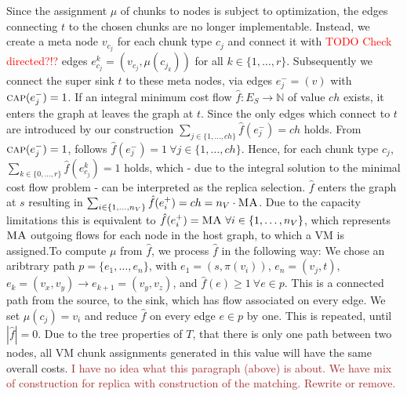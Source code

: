 \documentclass[9pt,twocolumn]{scrartcl}
\newcommand{\Capacity}{\ensuremath{\textsc{cap}}}
\newcommand{\carlo}[1]{\textcolor{red}{#1}}
\newcommand{\maciek}[1]{\textcolor{brown}{#1}}
\newcommand{\MaFactor}{\ensuremath{\textsc{MA}}}
\newcommand{\Path}{\ensuremath{p}}
\newcommand{\RedundancyFactor}{\ensuremath{r}}
\newcommand{\Source}{\ensuremath{s}}
\newcommand{\Sink}{\ensuremath{t}}
\newcommand{\VmChunkAssignment}{\mu}
\newcommand{\NodeMapping}{\pi}
\newcommand{\VirtualNode}{v}
\newcommand{\SubstrateEdges}{\ensuremath{E_S}}
\newcommand{\SubstrateNode}{\ensuremath{v}}
\newcommand{\SubstrateEdge}{\ensuremath{e}}
\newcommand{\achunk}{\ensuremath{c}}
\newcommand{\Tree}{\ensuremath{T}}
\newcommand{\Vms}{\ensuremath{n_V}}
\newcommand{\ChunkTypes}{\ensuremath{ch}}
\begin{document}
Since the assignment $\VmChunkAssignment$ of chunks to nodes 
is subject to optimization, the edges connecting $\Sink$ to the
chosen chunks are no longer implementable. Instead, we create a meta node
$\SubstrateNode_{\achunk_j}$ for each chunk type
$\achunk_j$ and connect it with \carlo{TODO Check directed?!?} edges
$\SubstrateEdge_{\achunk_j}^k = (\SubstrateNode_{\achunk_j},
\VmChunkAssignment(\achunk_{j_k}))$ for all $k \in
\{1,\dots,\RedundancyFactor\}$. Subsequently we connect the super sink
$\Sink$ to these meta nodes, via
edges $\SubstrateEdge_j^- = (\SubstrateNode)$ with
$\Capacity(\SubstrateEdge_j^-) = 1$. If an integral minimum cost flow $\hat f
: \SubstrateEdges \rightarrow \mathbb{N}$ of value $\ChunkTypes$ exists, it
enters the graph at leaves the graph at $\Sink$. Since the only
edges which connect to $\Sink$ are introduced by our construction $\sum_{j\in
\{1,\dots,\ChunkTypes\}} \hat f(\SubstrateEdge_j^-) = \ChunkTypes$ holds. From
$\Capacity(\SubstrateEdge_j^-) = 1$, follows $\hat f(\SubstrateEdge_j^-) = 1 ~
\forall j \in \{1,\dots, \ChunkTypes\}$. Hence, for each chunk type $\achunk_j$,
$\sum_{k \in \{0,\dots,\RedundancyFactor\}}\hat f(\SubstrateEdge_{c_j}^k) = 1$
holds, which - due to the integral solution to the minimal cost flow problem -
can be interpreted as the replica selection. $\hat f$ enters the graph at
$\Source$ resulting in $\sum_{i \in \{1,\dots,\Vms\}}\hat f(\SubstrateEdge_i^+)
= \ChunkTypes = \Vms \cdot \MaFactor$. Due to the capacity limitations this is
equivalent to $\hat f(\SubstrateEdge_i^+) = \MaFactor ~ \forall i \in
\{1,\dots, \Vms\}$, which represents $\MaFactor$ outgoing flows for each node
in the host graph, to which a VM is assigned.To compute $\VmChunkAssignment$ from $\hat f$, we process $\hat f$ in the
following way: We chose an aribtrary path $\Path =
\{\SubstrateEdge_{1}, \dots, \SubstrateEdge_{n}\}$, with $\SubstrateEdge_{1} =
(\Source, \NodeMapping(\VirtualNode_i))$, $\SubstrateEdge_{n} =
(\SubstrateNode_j, \Sink)$, $\SubstrateEdge_k= (\SubstrateNode_x,
\SubstrateNode_y) \rightarrow \SubstrateEdge_{k+1} = (\SubstrateNode_y,
\SubstrateNode_z)$, and $\hat f(\SubstrateEdge)\geq 1 ~ \forall \SubstrateEdge
\in \Path$. This is a connected path from the source, to the sink, which has
flow associated on every edge. We set $\VmChunkAssignment(\achunk_j) =
\VirtualNode_i$ and reduce $\hat f$ on every edge $\SubstrateEdge \in \Path$ by
one. This is repeated, until $|\hat f| = 0$. Due to the tree properties of
$\Tree$, that there is only one path between two nodes, all VM chunk
assignments generated in this value will have the same overall costs.
 \maciek{I have no idea what this paragraph (above) is about. We have mix of construction for replica with construction of the matching. Rewrite or remove.}
\end{document}
